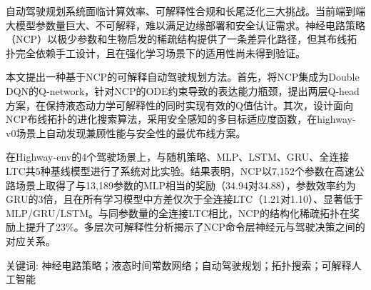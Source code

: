 

\song\xiaosi 自动驾驶规划系统面临计算效率、可解释性合规和长尾泛化三大挑战。当前端到端大模型参数量巨大、不可解释，难以满足边缘部署和安全认证需求。神经电路策略（NCP）以极少参数和生物启发的稀疏结构提供了一条差异化路径，但其布线拓扑完全依赖手工设计，且在强化学习场景下的适用性尚未得到验证。

本文提出一种基于NCP的可解释自动驾驶规划方法。首先，将NCP集成为Double DQN的Q-network，针对NCP的ODE约束导致的表达能力瓶颈，提出两层Q-head方案，在保持液态动力学可解释性的同时实现有效的Q值估计。其次，设计面向NCP布线拓扑的进化搜索算法，采用安全感知的多目标适应度函数，在highway-v0场景上自动发现兼顾性能与安全性的最优布线方案。

在Highway-env的4个驾驶场景上，与随机策略、MLP、LSTM、GRU、全连接LTC共5种基线模型进行了系统对比实验。结果表明，NCP以7,152个参数在高速公路场景上取得了与13,189参数的MLP相当的奖励（34.94对34.88），参数效率约为GRU的3倍，且在所有学习模型中方差仅次于全连接LTC（1.21对1.10）、显著低于MLP/GRU/LSTM。与同参数量的全连接LTC相比，NCP的结构化稀疏拓扑在奖励上提升了23\%。多层次可解释性分析揭示了NCP命令层神经元与驾驶决策之间的对应关系。

\vspace{\baselineskip}
\noindent \xiaosi\hei 关键词: \song\xiaosi 神经电路策略；液态时间常数网络；自动驾驶规划；拓扑搜索；可解释人工智能